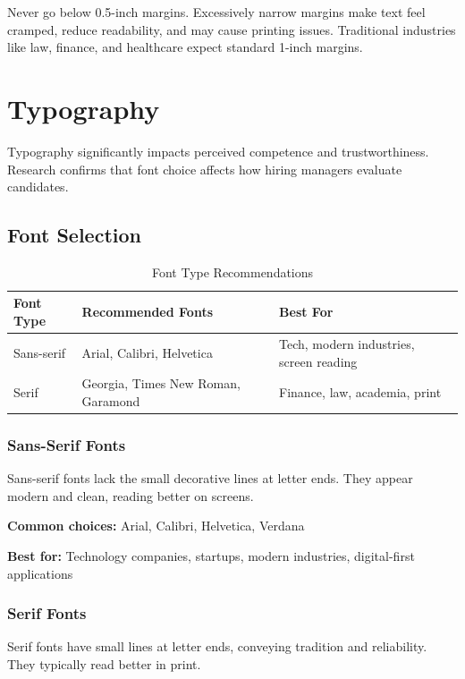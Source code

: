 \documentclass[11pt,a4paper]{article}
\begin{document}
\begin{warning}
Never go below 0.5-inch margins. Excessively narrow margins make text feel cramped, reduce readability, and may cause printing issues. Traditional industries like law, finance, and healthcare expect standard 1-inch margins.
\end{warning}

\section{Typography}

Typography significantly impacts perceived competence and trustworthiness. Research confirms that font choice affects how hiring managers evaluate candidates.

\subsection{Font Selection}

\begin{table}[h]
\centering
\begin{tabular}{@{}lll@{}}
\toprule
\textbf{Font Type} & \textbf{Recommended Fonts} & \textbf{Best For} \\
\midrule
Sans-serif & Arial, Calibri, Helvetica & Tech, modern industries, screen reading \\
Serif & Georgia, Times New Roman, Garamond & Finance, law, academia, print \\
\bottomrule
\end{tabular}
\caption{Font Type Recommendations}
\end{table}

\subsubsection{Sans-Serif Fonts}

Sans-serif fonts lack the small decorative lines at letter ends. They appear modern and clean, reading better on screens.

\textbf{Common choices:} Arial, Calibri, Helvetica, Verdana

\textbf{Best for:} Technology companies, startups, modern industries, digital-first applications

\subsubsection{Serif Fonts}

Serif fonts have small lines at letter ends, conveying tradition and reliability. They typically read better in print.
\end{document}
